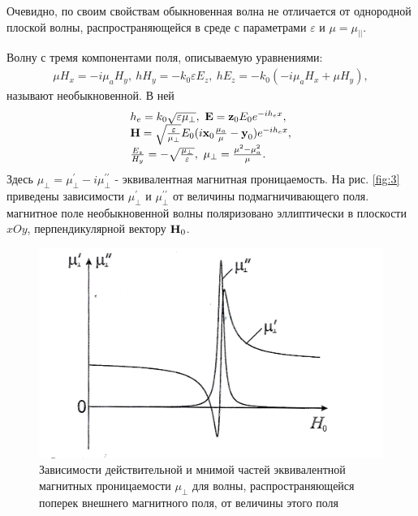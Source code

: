 Очевидно, по своим свойствам обыкновенная волна не отличается от однородной плоской волны, распространяющейся в среде с параметрами $\varepsilon$ и $\mu=\mu_{||}$.

Волну с тремя компонентами поля, описываемую уравнениями:
\begin{equation}
    \begin{array}
    	{ll}{\mu H_x=-i\mu_a H_y,~ hH_y = -k_0\varepsilon E_z,~ hE_z=-k_0(-i\mu_a H_x + \mu H_y)}, \end{array}
    \label{eq:2:14}
\end{equation}
называют необыкновенной. В ней
\begin{equation}
    \begin{array}
    	{ll}{h_e=k_0\sqrt{\varepsilon \mu_{\bot}},~\textbf{E}=\textbf{z}_0 E_0 e^{-ih_ex}}, \\ 
    	{\textbf{H}= \sqrt{\frac{\varepsilon}{\mu_{\bot}}} E_0(i\textbf{x}_0 \frac{\mu_a}{\mu}-\textbf{y}_0)e^{-ih_ex}}, \\
    	{\frac{E_z}{H_y}=-\sqrt{\frac{\mu_{\bot}}{\varepsilon}},~\mu_{\bot}=\frac{\mu^2-\mu_a^2}{\mu}}. \end{array}
    \label{eq:2:15}
\end{equation}
Здесь $\mu_{\bot}=\mu_{\bot}^{\prime}-i\mu_{\bot}^{\prime \prime}$ - эквивалентная магнитная проницаемость. На рис. \ref{fig:3} приведены зависимости $\mu_{\bot}^{\prime}$ и $\mu_{\bot}^{\prime \prime}$ от величины подмагничивающего поля. магнитное поле необыкновенной волны поляризовано эллиптически в плоскости $xOy$, перпендикулярной вектору $\textbf{H}_0$.
\begin{figure}[H]
    \centering
    \includegraphics[width = 0.6\linewidth]{imgs/temp/004.JPG}
    \caption{Зависимости действительной и мнимой частей эквивалентной магнитных проницаемости
    $\mu_{\bot}$ для волны, распространяющейся поперек внешнего магнитного поля, от величины этого поля}
    \label{fig:4}
\end{figure}
